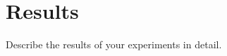 \documentclass[report.tex]{subfiles}
\begin{document}

    \section{Results}

    Describe the results of your experiments in detail.
\end{document}
